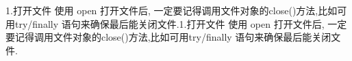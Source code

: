 1.打开文件 使用 open 打开文件后, 一定要记得调用文件对象的close()方法,比如可用try/finally 语句来确保最后能关闭文件.1.打开文件 使用 open 打开文件后, 一定要记得调用文件对象的close()方法,比如可用try/finally 语句来确保最后能关闭文件.
